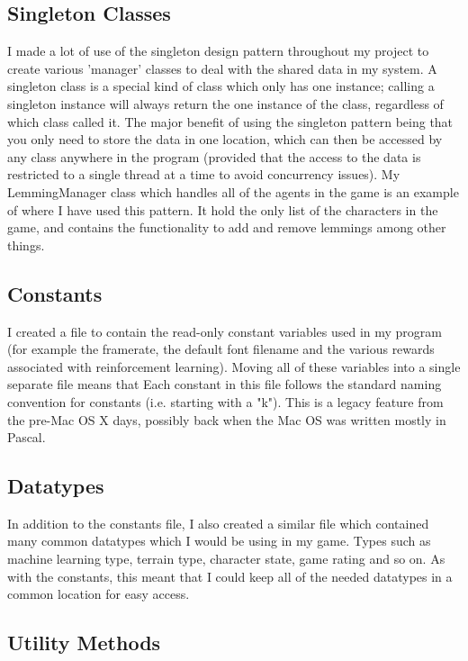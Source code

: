 \documentclass[a4paper,oneside]{report}
\begin{document}
\subsection{Singleton Classes} 

I made a lot of use of the singleton design pattern throughout my project to create various 'manager' classes to deal with the shared data in my system. A singleton class is a special kind of class which only has one instance; calling a singleton instance will always return the one instance of the class, regardless of which class called it. The major benefit of using the singleton pattern being that you only need to store the data in one location, which can then be accessed by any class anywhere in the program (provided that the access to the data is restricted to a single thread at a time to avoid concurrency issues). My LemmingManager class which handles all of the agents in the game is an example of where I have used this pattern. It hold the only list of the characters in the game, and contains the functionality to add and remove lemmings among other things.

\subsection{Constants} 

I created a file to contain the read-only constant variables used in my program (for example the framerate, the default font filename and the various rewards associated with reinforcement learning). Moving all of these variables into a single separate file means that Each constant in this file follows the standard naming convention for constants (i.e. starting with a "k"). This is a legacy feature from the pre-Mac OS X days, possibly back when the Mac OS was written mostly in Pascal. 

\subsection{Datatypes} 

In addition to the constants file, I also created a similar file which contained many common datatypes which I would be using in my game. Types such as machine learning type, terrain type, character state, game rating and so on. As with the constants, this meant that I could keep all of the needed datatypes in a common location for easy access.

\subsection{Utility Methods} 
\end{document}
